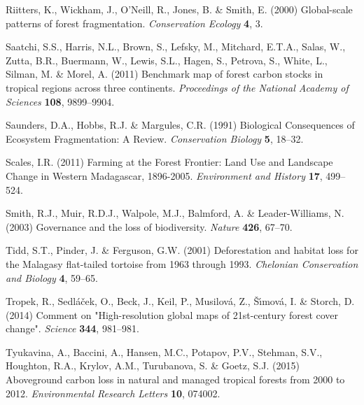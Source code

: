 \documentclass[a4paper, 12pt, leqno]{article} %
\begin{document}
\begin{thebibliography}{60}
Riitters, K., Wickham, J., O'Neill, R., Jones, B. \& Smith, E. (2000)
  Global-scale patterns of forest fragmentation. \emph{Conservation Ecology}
  \textbf{4}, 3.

Saatchi, S.S., Harris, N.L., Brown, S., Lefsky, M., Mitchard, E.T.A., Salas,
  W., Zutta, B.R., Buermann, W., Lewis, S.L., Hagen, S., Petrova, S., White,
  L., Silman, M. \& Morel, A. (2011) Benchmark map of forest carbon stocks in
  tropical regions across three continents. \emph{Proceedings of the National
  Academy of Sciences} \textbf{108}, 9899--9904.

Saunders, D.A., Hobbs, R.J. \& Margules, C.R. (1991) {Biological Consequences
  of Ecosystem Fragmentation: A Review}. \emph{Conservation Biology}
  \textbf{5}, 18--32.

Scales, I.R. (2011) {Farming at the Forest Frontier: Land Use and Landscape
  Change in Western Madagascar, 1896-2005}. \emph{Environment and History}
  \textbf{17}, 499--524.

Smith, R.J., Muir, R.D.J., Walpole, M.J., Balmford, A. \& Leader-Williams, N.
  (2003) Governance and the loss of biodiversity. \emph{Nature} \textbf{426},
  67--70.

Tidd, S.T., Pinder, J. \& Ferguson, G.W. (2001) {Deforestation and habitat loss
  for the Malagasy flat-tailed tortoise from 1963 through 1993}.
  \emph{Chelonian Conservation and Biology} \textbf{4}, 59--65.

Tropek, R., Sedl{\'a}{\v c}ek, O., Beck, J., Keil, P., Musilov{\'a}, Z., {\v
  S}{\'\i}mov{\'a}, I. \& Storch, D. (2014) {Comment on "High-resolution global
  maps of 21st-century forest cover change"}. \emph{Science} \textbf{344},
  981--981.

Tyukavina, A., Baccini, A., Hansen, M.C., Potapov, P.V., Stehman, S.V.,
  Houghton, R.A., Krylov, A.M., Turubanova, S. \& Goetz, S.J. (2015)
  Aboveground carbon loss in natural and managed tropical forests from 2000 to
  2012. \emph{Environmental Research Letters} \textbf{10}, 074002.


\end{thebibliography}
\end{document}
